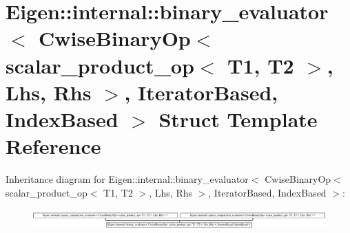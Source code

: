 \hypertarget{struct_eigen_1_1internal_1_1binary__evaluator_3_01_cwise_binary_op_3_01scalar__product__op_3_01_f2d05246f46046f640624904370b9473}{}\section{Eigen\+:\+:internal\+:\+:binary\+\_\+evaluator$<$ Cwise\+Binary\+Op$<$ scalar\+\_\+product\+\_\+op$<$ T1, T2 $>$, Lhs, Rhs $>$, Iterator\+Based, Index\+Based $>$ Struct Template Reference}
\label{struct_eigen_1_1internal_1_1binary__evaluator_3_01_cwise_binary_op_3_01scalar__product__op_3_01_f2d05246f46046f640624904370b9473}
Inheritance diagram for Eigen\+:\+:internal\+:\+:binary\+\_\+evaluator$<$ Cwise\+Binary\+Op$<$ scalar\+\_\+product\+\_\+op$<$ T1, T2 $>$, Lhs, Rhs $>$, Iterator\+Based, Index\+Based $>$\+:\begin{figure}[H]
\begin{center}
\leavevmode
\includegraphics[height=0.775623cm]{struct_eigen_1_1internal_1_1binary__evaluator_3_01_cwise_binary_op_3_01scalar__product__op_3_01_f2d05246f46046f640624904370b9473}
\end{center}
\end{figure}
